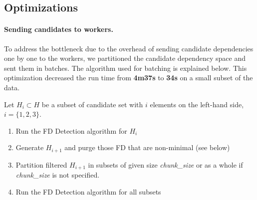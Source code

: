 \documentclass{article}
\begin{document}
    \subsection{Optimizations}\label{sec:optimizations}
    
        \paragraph{Sending candidates to workers.}
        To address the bottleneck due to the overhead of sending candidate dependencies one by one to the workers, we partitioned the candidate dependency space and sent them in batches. The algorithm used for batching is explained below. This optimization decreased the run time from \textbf{4m37s} to \textbf{34s} on a small subset of the data.
        
        Let $H_i \subset H$ be a subset of candidate set with $i$ elements on the left-hand side, $i = \{1,2,3\}$.
        
        \begin{enumerate}[noitemsep]
            \item Run the FD Detection algorithm for $H_i$
            \item Generate $H_{i+1}$ and purge those FD that are non-minimal (see below)
            \item Partition filtered $H_{i+1}$ in subsets of given size \textit{chunk\_size} or as a whole if \textit{chunk\_size} is not specified.
            \item Run the FD Detection algorithm for all subsets
        \end{enumerate}
        
        
        
\end{document}
